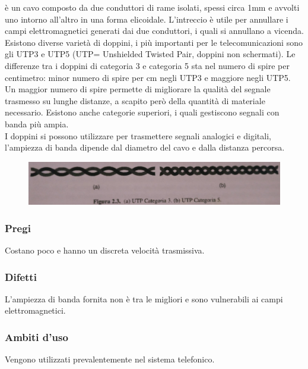 è un cavo composto da due conduttori di rame isolati, spessi circa 1mm e avvolti uno intorno all’altro in una forma elicoidale. L’intreccio è utile per annullare i campi elettromagnetici generati dai due conduttori, i quali si annullano a vicenda. Esistono diverse varietà di doppini, i più importanti per le telecomunicazioni sono gli UTP3 e UTP5 (UTP= Unshielded Twisted Pair, doppini non schermati). Le differenze tra i doppini di categoria 3 e categoria 5 sta nel numero di spire per centimetro: minor numero di spire per cm negli UTP3 e maggiore negli UTP5. Un maggior numero di spire permette di migliorare la qualità del segnale trasmesso su lunghe distanze, a scapito però della quantità di materiale necessario. Esistono anche categorie superiori, i quali gestiscono segnali con banda più ampia.  \\
I doppini si possono utilizzare per trasmettere segnali analogici e digitali, l’ampiezza di banda dipende dal diametro del cavo e dalla distanza percorsa.

\begin{figure}[H]
\centering
\includegraphics[scale=0.7]{res/img/3_Doppino.jpg}
\end{figure}


\subsubsection{Pregi}
Costano poco e hanno un discreta velocità trasmissiva.

\subsubsection{Difetti}
L'ampiezza di banda fornita non è tra le migliori e sono vulnerabili ai campi elettromagnetici.

\subsubsection{Ambiti d'uso}
Vengono utilizzati prevalentemente nel sistema telefonico.

